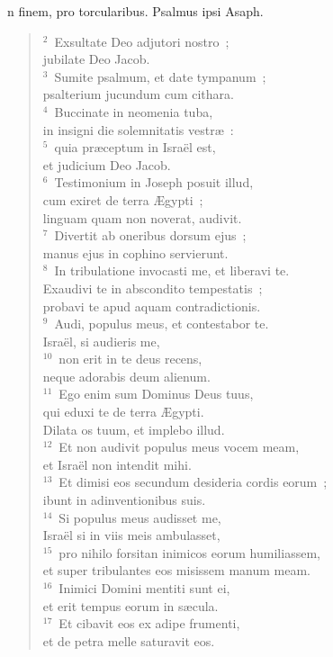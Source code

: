 \bchapter[Psalm]
n finem, pro torcularibus. Psalmus ipsi Asaph.
\begin{verse}${}^{2}$~Exsultate Deo adjutori nostro~;\\ jubilate Deo Jacob.\\
${}^{3}$~Sumite psalmum, et date tympanum~;\\ psalterium jucundum cum cithara.\\
${}^{4}$~Buccinate in neomenia tuba,\\ in insigni die solemnitatis vestr\ae~:\\
${}^{5}$~quia pr\ae ceptum in Isra\"el est,\\ et judicium Deo Jacob.\\
${}^{6}$~Testimonium in Joseph posuit illud,\\ cum exiret de terra \AE gypti~;\\ linguam quam non noverat, audivit.\\
${}^{7}$~Divertit ab oneribus dorsum ejus~;\\ manus ejus in cophino servierunt.\\
${}^{8}$~In tribulatione invocasti me, et liberavi te.\\ Exaudivi te in abscondito tempestatis~;\\ probavi te apud aquam contradictionis.\\
${}^{9}$~Audi, populus meus, et contestabor te.\\ Isra\"el, si audieris me,\\
${}^{10}$~non erit in te deus recens,\\ neque adorabis deum alienum.\\
${}^{11}$~Ego enim sum Dominus Deus tuus,\\ qui eduxi te de terra \AE gypti.\\ Dilata os tuum, et implebo illud.\\
${}^{12}$~Et non audivit populus meus vocem meam,\\ et Isra\"el non intendit mihi.\\
${}^{13}$~Et dimisi eos secundum desideria cordis eorum~;\\ ibunt in adinventionibus suis.\\
${}^{14}$~Si populus meus audisset me,\\ Isra\"el si in viis meis ambulasset,\\
${}^{15}$~pro nihilo forsitan inimicos eorum humiliassem,\\ et super tribulantes eos misissem manum meam.\\
${}^{16}$~Inimici Domini mentiti sunt ei,\\ et erit tempus eorum in s\ae cula.\\
${}^{17}$~Et cibavit eos ex adipe frumenti,\\ et de petra melle saturavit eos.\end{verse}



